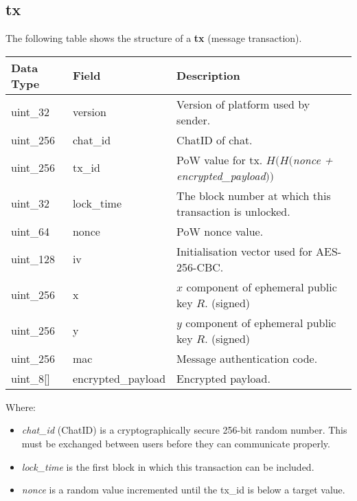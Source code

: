 \documentclass{article}
\begin{document}
\subsection{tx}
The following table shows the structure of a \textbf{tx} (message transaction).
\begin{table}[H]
\centering
\begin{tabular}{|p{1.3cm}|p{3cm}|p{5.5cm}|}
\hline
\rowcolor{tblgrey}
Data Type   & Field       & Description\\ \hline
uint\_32    & version     & Version of platform used by sender.                      \\ \hline
uint\_256   & chat\_id    & ChatID of chat.                                           \\ \hline
uint\_256   & tx\_id      & PoW value for tx. $H(H($\textit{nonce + encrypted\_payload}$))$ \\ \hline
uint\_32    & lock\_time  & The block number at which this transaction is unlocked. \\ \hline
uint\_64    & nonce       & PoW nonce value. \\ \hline
uint\_128   & iv          & Initialisation vector used for AES-256-CBC.   \\ \hline
uint\_256   & x           & $x$ component of ephemeral public key $R$. (signed)    \\ \hline
uint\_256   & y           & $y$ component of ephemeral public key $R$. (signed)    \\ \hline
uint\_256   & mac         & Message authentication code. \\ \hline
uint\_8[\hspace{0.05cm}]  & encrypted\_payload & Encrypted payload. \\ \hline
\end{tabular}
\end{table}
Where:
\begin{itemize}
    \item \textit{chat\_id} (ChatID) is a cryptographically secure 256-bit random number. This must be exchanged between users before they can communicate properly.
    \item \textit{lock\_time} is the first block in which this transaction can be included.
    \item \textit{nonce} is a random value incremented until the tx\_id is below a target value.
\end{itemize}

\vspace{0.5cm}
\end{document}
